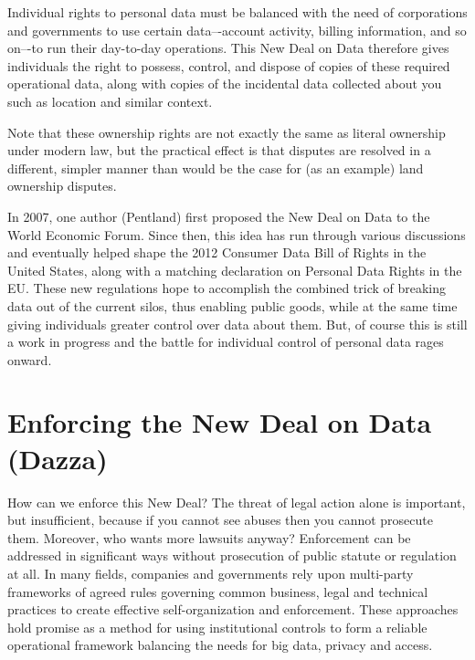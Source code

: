 Individual rights to personal data must be balanced with the need of corporations and governments to use certain data–-account activity, billing information, and so on–-to run their day-to-day operations.
This New Deal on Data therefore gives individuals the right to possess, control, and dispose of copies of these required operational data, along with copies of the incidental data collected about you such as location and similar context.

Note that these ownership rights are not exactly the same as literal ownership under modern law, but the practical effect is that disputes are resolved in a different, simpler manner than would be the case for (as an example) land ownership disputes.

In 2007, one author (Pentland) first proposed the New Deal on Data to the World Economic Forum. 
Since then, this idea has run through various discussions and eventually helped shape the 2012 Consumer Data Bill of Rights in the United States, along with a matching declaration on Personal Data Rights in the EU.
These new regulations hope to accomplish the combined trick of breaking data out of the current silos, thus enabling public goods, while at the same time giving individuals greater control over data about them.
But, of course this is still a work in progress and the battle for individual control of personal data rages onward.

\section{Enforcing the New Deal on Data (Dazza)}

How can we enforce this New Deal?
The threat of legal action alone is important, but insufficient, because if you cannot see abuses then you cannot prosecute them.
Moreover, who wants more lawsuits anyway?
Enforcement can be addressed in significant ways without prosecution of public statute or regulation at all.
In many fields, companies and governments rely upon multi-party frameworks of agreed rules governing common business, legal and technical practices to create effective self-organization and enforcement.
These approaches hold promise as a method for using institutional controls to form a reliable operational framework balancing the needs for big data, privacy and access.


